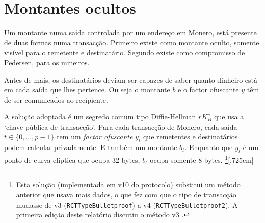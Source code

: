 \section{Montantes ocultos}
\label{sec:pedersen_monero}

Um montante numa saída controlada por um endereço em Monero, está presente de duas formas numa transacção. Primeiro existe como montante oculto, somente visível para o remetente e destinatário. Segundo existe como compromisso de Pedersen, para os mineiros.

Antes de mais, os destinatários deviam ser capazes de saber quanto dinheiro está em cada saída que lhes pertence. Ou seja o montante $b$ e o factor ofuscante $y$ têm de ser comunicados ao recipiente.

A solução adoptada é um segredo comum tipo Diffie-Hellman $r K_B^v$ que usa a `chave pública de transacção'.
Para cada transacção de Monero, cada saída $t \in \{0, ..., p-1\}$ tem um {\em factor ofuscante} $y_t$ que remetentes e destinatários podem calcular privadamente. E também um montante $b_t$. \newline
Enquanto que $y_t$ é um ponto de curva elíptica que ocupa 32 bytes, $b_t$ ocupa somente 8 bytes.  
\footnote{Esta solução (implementada em v10 do protocolo) substitui um método anterior que usava mais dados, o que fez com que o tipo de transacção mudasse de v3 ({\tt RCTTypeBulletproof}) a v4 ({\tt RCTTypeBulletproof2}). A primeira edição deste relatório discutiu o método v3 \cite{ztm-1}.}[.725cm]


